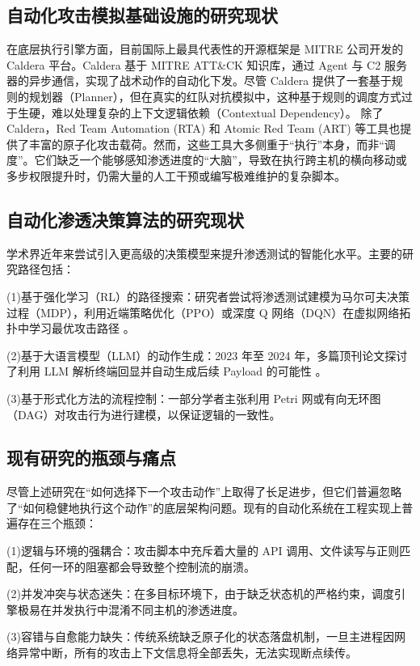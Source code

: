 \documentclass[twoside,openright]{xduugthesis}
\begin{document}
\subsection{自动化攻击模拟基础设施的研究现状}
在底层执行引擎方面，目前国际上最具代表性的开源框架是 MITRE 公司开发的 Caldera 平台。Caldera 基于 MITRE ATT&CK 知识库，通过 Agent 与 C2 服务器的异步通信，实现了战术动作的自动化下发\cite{mitre2024caldera}。尽管 Caldera 提供了一套基于规则的规划器（Planner），但在真实的红队对抗模拟中，这种基于规则的调度方式过于生硬，难以处理复杂的上下文逻辑依赖（Contextual Dependency）。
除了 Caldera，Red Team Automation (RTA) 和 Atomic Red Team (ART) 等工具也提供了丰富的原子化攻击载荷。然而，这些工具大多侧重于“执行”本身，而非“调度”。它们缺乏一个能够感知渗透进度的“大脑”，导致在执行跨主机的横向移动或多步权限提升时，仍需大量的人工干预或编写极难维护的复杂脚本。

\subsection{自动化渗透决策算法的研究现状}
学术界近年来尝试引入更高级的决策模型来提升渗透测试的智能化水平。主要的研究路径包括：

(1)基于强化学习（RL）的路径搜索：研究者尝试将渗透测试建模为马尔可夫决策过程（MDP），利用近端策略优化（PPO）或深度 Q 网络（DQN）在虚拟网络拓扑中学习最优攻击路径 \cite{wang2024automated}。

(2)基于大语言模型（LLM）的动作生成：2023 年至 2024 年，多篇顶刊论文探讨了利用 LLM 解析终端回显并自动生成后续 Payload 的可能性 \cite{zhang2024towards}。

(3)基于形式化方法的流程控制：一部分学者主张利用 Petri 网或有向无环图（DAG）对攻击行为进行建模，以保证逻辑的一致性。

\subsection{现有研究的瓶颈与痛点}
尽管上述研究在“如何选择下一个攻击动作”上取得了长足进步，但它们普遍忽略了“如何稳健地执行这个动作”的底层架构问题。现有的自动化系统在工程实现上普遍存在三个瓶颈：

(1)逻辑与环境的强耦合：攻击脚本中充斥着大量的 API 调用、文件读写与正则匹配，任何一环的阻塞都会导致整个控制流的崩溃。

(2)并发冲突与状态迷失：在多目标环境下，由于缺乏状态机的严格约束，调度引擎极易在并发执行中混淆不同主机的渗透进度。

(3)容错与自愈能力缺失：传统系统缺乏原子化的状态落盘机制，一旦主进程因网络异常中断，所有的攻击上下文信息将全部丢失，无法实现断点续传。
\end{document}
